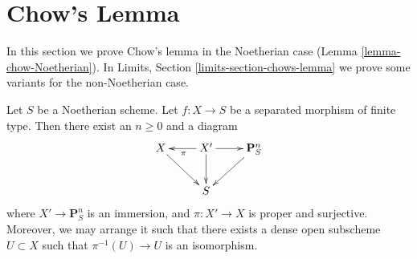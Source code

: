 \section{Chow's Lemma}
\label{section-chows-lemma}

\noindent
In this section we prove Chow's lemma in the Noetherian
case (Lemma \ref{lemma-chow-Noetherian}).
In
Limits, Section \ref{limits-section-chows-lemma}
we prove some variants for the non-Noetherian case.

\begin{lemma}
\label{lemma-chow-Noetherian}
\begin{reference}
\cite[II Theorem 5.6.1(a)]{EGA}
\end{reference}
Let $S$ be a Noetherian scheme.
Let $f : X \to S$ be a separated morphism of finite type.
Then there exist an $n \geq 0$ and a diagram
$$
\xymatrix{
X \ar[rd] & X' \ar[d] \ar[l]^\pi \ar[r] & \mathbf{P}^n_S \ar[dl] \\
& S &
}
$$
where $X' \to \mathbf{P}^n_S$ is an immersion, and
$\pi : X' \to X$ is proper and surjective. Moreover, we may
arrange it such that there exists a dense open subscheme
$U \subset X$ such that $\pi^{-1}(U) \to U$ is an isomorphism.
\end{lemma}

